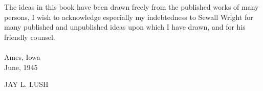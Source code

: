 The ideas in this book have been drawn freely from the published works of many persons, I wish to acknowledge especially my indebtedness to Sewall Wright for many published and unpublished ideas upon which I have drawn, and for his friendly counsel.\\
~\\
Ames, Iowa\\
June, 1945\\
\begin{flushright}
	JAY L. LUSH
\end{flushright}